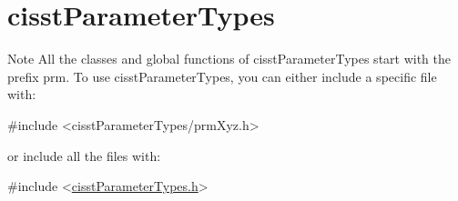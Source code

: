 \hypertarget{group__cisst_parameter_types}{}\section{cisst\+Parameter\+Types}
\label{group__cisst_parameter_types}
\begin{DoxyNote}{Note}
All the classes and global functions of cisst\+Parameter\+Types start with the prefix prm. To use cisst\+Parameter\+Types, you can either include a specific file with\+: 
\begin{DoxyCode}
\textcolor{preprocessor}{#include <cisstParameterTypes/prmXyz.h>}
\end{DoxyCode}
 or include all the files with\+: 
\begin{DoxyCode}
\textcolor{preprocessor}{#include <\hyperlink{cisst_parameter_types_8h}{cisstParameterTypes.h}>}
\end{DoxyCode}
 
\end{DoxyNote}
